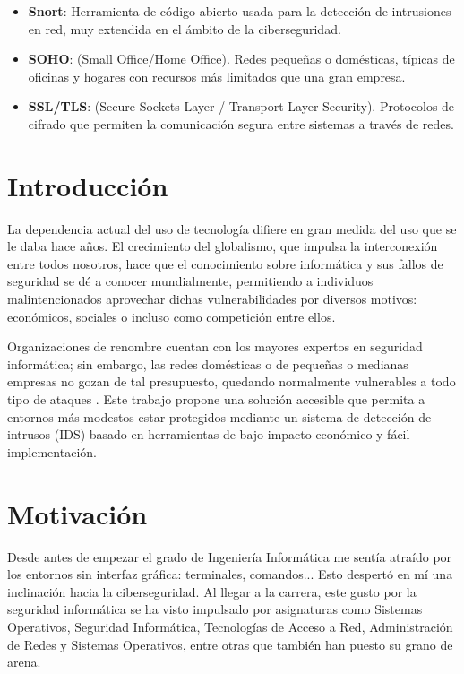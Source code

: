 \documentclass[11pt,a4paper,twoside]{report}
\begin{document}
\begin{itemize}
	\item \textbf{Snort}: Herramienta de código abierto usada para la detección de intrusiones en red, muy extendida en el ámbito de la ciberseguridad.
	\item \textbf{SOHO}: (Small Office/Home Office). Redes pequeñas o domésticas, típicas de oficinas y hogares con recursos más limitados que una gran empresa.
	\item \textbf{SSL/TLS}: (Secure Sockets Layer / Transport Layer Security). Protocolos de cifrado que permiten la comunicación segura entre sistemas a través de redes.
\end{itemize}

\chapter*{Introducción}
La dependencia actual del uso de tecnología difiere en gran medida del uso que se le daba hace años. El crecimiento del globalismo, que impulsa la interconexión entre todos nosotros, hace que el conocimiento sobre informática y sus fallos de seguridad se dé a conocer mundialmente, permitiendo a individuos malintencionados aprovechar dichas vulnerabilidades por diversos motivos: económicos, sociales o incluso como competición entre ellos.\newline

Organizaciones de renombre cuentan con los mayores expertos en seguridad informática; sin embargo, las redes domésticas o de pequeñas o medianas empresas no gozan de tal presupuesto, quedando normalmente vulnerables a todo tipo de ataques \cite{enisa_smes}. Este trabajo propone una solución accesible que permita a entornos más modestos estar protegidos mediante un sistema de detección de intrusos (IDS) basado en herramientas de bajo impacto económico y fácil implementación.

\chapter{Motivación}
Desde antes de empezar el grado de Ingeniería Informática me sentía atraído por los entornos sin interfaz gráfica: terminales, comandos... Esto despertó en mí una inclinación hacia la ciberseguridad. Al llegar a la carrera, este gusto por la seguridad informática se ha visto impulsado por asignaturas como Sistemas Operativos, Seguridad Informática, Tecnologías de Acceso a Red, Administración de Redes y Sistemas Operativos, entre otras que también han puesto su grano de arena.\newline
\end{document}
